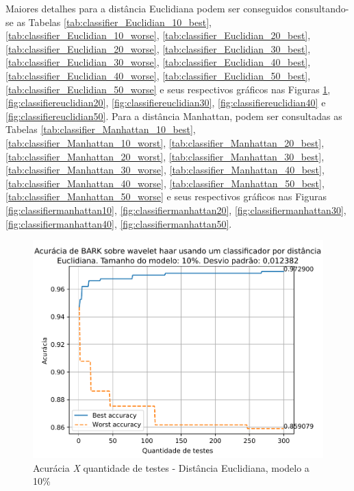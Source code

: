 		\par Maiores detalhes para a distância Euclidiana podem ser conseguidos consultando-se as Tabelas \ref{tab:classifier_Euclidian_10_best},\ref{tab:classifier_Euclidian_10_worse},
		 \ref{tab:classifier_Euclidian_20_best}, \ref{tab:classifier_Euclidian_20_worse}, 
		 \ref{tab:classifier_Euclidian_30_best}, \ref{tab:classifier_Euclidian_30_worse}, 
		 \ref{tab:classifier_Euclidian_40_best}, \ref{tab:classifier_Euclidian_40_worse}, 
		 \ref{tab:classifier_Euclidian_50_best}, \ref{tab:classifier_Euclidian_50_worse}
		  e seus respectivos gráficos nas Figuras \ref{fig:classifiereuclidian10}, \ref{fig:classifiereuclidian20}, \ref{fig:classifiereuclidian30}, \ref{fig:classifiereuclidian40} e \ref{fig:classifiereuclidian50}. Para a distância Manhattan, podem ser consultadas as Tabelas 	\ref{tab:classifier_Manhattan_10_best}, \ref{tab:classifier_Manhattan_10_worst}, 
		  \ref{tab:classifier_Manhattan_20_best}, \ref{tab:classifier_Manhattan_20_worst}, 
		  \ref{tab:classifier_Manhattan_30_best}, \ref{tab:classifier_Manhattan_30_worse}, 
		  \ref{tab:classifier_Manhattan_40_best}, \ref{tab:classifier_Manhattan_40_worse}, 
		  \ref{tab:classifier_Manhattan_50_best}, \ref{tab:classifier_Manhattan_50_worse} 
		  e seus respectivos gráficos nas Figuras		 
		 \ref{fig:classifiermanhattan10}, \ref{fig:classifiermanhattan20}, 	 \ref{fig:classifiermanhattan30}, \ref{fig:classifiermanhattan40},  \ref{fig:classifiermanhattan50}.
		
		
			
		\newpage
		\begin{figure}
			\centering
			\includegraphics{images/results/confusionMatrices/classifier_Euclidian_10}
			\caption{Acurácia \textit{X} quantidade de testes - Distância Euclidiana, modelo a 10\%}
			\label{fig:classifiereuclidian10}
		\end{figure}
		
		
